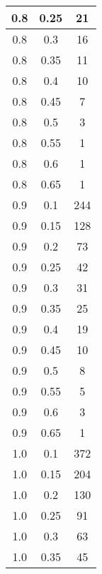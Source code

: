 \documentclass[12pt,letterpaper, onecolumn]{exam}
\begin{document}
\begin{questions}
\begin{solution}
\begin{center}
\begin{tabular}{|c|c|c|}
                \hline
                0.8 & 0.25 & 21 \\
                \hline
                0.8 & 0.3 & 16 \\
                \hline
                0.8 & 0.35 & 11 \\
                \hline
                0.8 & 0.4 & 10 \\
                \hline
                0.8 & 0.45 & 7 \\
                \hline
                0.8 & 0.5 & 3 \\
                \hline
                0.8 & 0.55 & 1 \\
                \hline
                0.8 & 0.6 & 1 \\
                \hline
                0.8 & 0.65 & 1 \\
                \hline
                0.9 & 0.1 & 244 \\
                \hline
                0.9 & 0.15 & 128 \\
                \hline
                0.9 & 0.2 & 73 \\
                \hline
                0.9 & 0.25 & 42 \\
                \hline
                0.9 & 0.3 & 31 \\
                \hline
                0.9 & 0.35 & 25 \\
                \hline
                0.9 & 0.4 & 19 \\
                \hline
                0.9 & 0.45 & 10 \\
                \hline
                0.9 & 0.5 & 8 \\
                \hline
                0.9 & 0.55 & 5 \\
                \hline
                0.9 & 0.6 & 3 \\
                \hline
                0.9 & 0.65 & 1 \\
                \hline
                1.0 & 0.1 & 372 \\
                \hline
                1.0 & 0.15 & 204 \\
                \hline
                1.0 & 0.2 & 130 \\
                \hline
                1.0 & 0.25 & 91 \\
                \hline
                1.0 & 0.3 & 63 \\
                \hline
                1.0 & 0.35 & 45 \\

\end{tabular}
\end{center}
\end{solution}
\end{questions}
\end{document}
